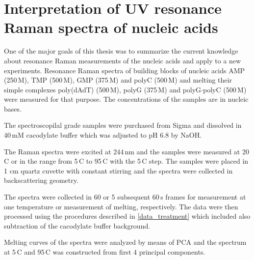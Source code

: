 \section{Interpretation of UV resonance Raman spectra of nucleic acids}

\newlength{\assignwnl}
\settowidth{\assignwnl}{0000}
\newlength{\assignwnil}
\settowidth{\assignwnil}{(000)}
\newlength{\assignwnspl}
\setlength{\assignwnspl}{0.2cm}
\newlength{\assigntabrowindent}
\setlength{\assigntabrowindent}{.7em}


One of the major goals of this thesis was to summarize the current knowledge
about resonance Raman measurements of the nucleic acids and apply to a new
experiments.
Resonance Raman spectra of building blocks of nucleic acids AMP (250\,M),
TMP (500\,M), GMP (375\,M) and polyC (500\,M) and melting their
simple complexes poly(dAdT) (500\,M), polyG (375\,M) and
polyG$\cdot$polyC (500\,M) were measured for that purpose.
The concentrations of the samples are in nucleic bases.

The spectroscopilal grade samples were purchased from Sigma and dissolved in
40\,mM cacodylate buffer which was adjusted to pH 6.8 by NaOH.

The Raman spectra were excited at 244\,nm and the samples were measured at
20\,\textdegree{}C or in the range from 5\,\textdegree{}C to 95\,\textdegree{}C
with the 5\,\textdegree{}C step. The samples were placed in 1 cm quartz cuvette
with constant stirring and the spectra were collected in backscattering
geometry.

The spectra were collected in 60 or 5 subsequent 60\,s frames for measurement
at one temperature or measurement of melting, respectively.
The data were then processed using the procedures described in
\cref{data_treatment}
which included also subtraction of the cacodylate buffer background.

Melting curves of the spectra were analyzed by means of PCA and the spectrum
at 5\,\textdegree{}C and 95\,\textdegree{}C was constructed from first 4
principal components.


